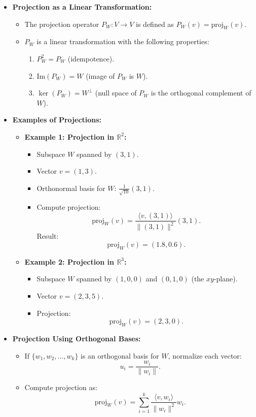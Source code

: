 \documentclass{article}
\begin{document}
\begin{itemize}
  \item \textbf{Projection as a Linear Transformation:}
    \begin{itemize}
      \item The projection operator $P_W: V \to V$ is defined as $P_W(v) = \text{proj}_W(v)$.
      \item $P_W$ is a linear transformation with the following properties:
        \begin{enumerate}
          \item $P_W^2 = P_W$ (idempotence).
          \item $\text{Im}(P_W) = W$ (image of $P_W$ is $W$).
          \item $\ker(P_W) = W^\perp$ (null space of $P_W$ is the orthogonal complement of $W$).
        \end{enumerate}
    \end{itemize}

  \item \textbf{Examples of Projections:}
    \begin{itemize}
      \item \textbf{Example 1: Projection in $\mathbb{R}^2$:}
        \begin{itemize}
          \item Subspace $W$ spanned by $(3, 1)$.
          \item Vector $v = (1, 3)$.
          \item Orthonormal basis for $W$: $\frac{1}{\sqrt{10}}(3, 1)$.
          \item Compute projection:
            \[
              \text{proj}_W(v) = \frac{\langle v, (3, 1) \rangle}{\|(3, 1)\|^2} (3, 1).
            \]
            Result:
            \[
              \text{proj}_W(v) = (1.8, 0.6).
            \]
        \end{itemize}
      \item \textbf{Example 2: Projection in $\mathbb{R}^3$:}
        \begin{itemize}
          \item Subspace $W$ spanned by $(1, 0, 0)$ and $(0, 1, 0)$ (the $xy$-plane).
          \item Vector $v = (2, 3, 5)$.
          \item Projection:
            \[
              \text{proj}_W(v) = (2, 3, 0).
            \]
        \end{itemize}
    \end{itemize}

  \item \textbf{Projection Using Orthogonal Bases:}
    \begin{itemize}
      \item If $\{w_1, w_2, \dots, w_k\}$ is an orthogonal basis for $W$, normalize each vector:
        \[
          u_i = \frac{w_i}{\|w_i\|}.
        \]
      \item Compute projection as:
        \[
          \text{proj}_W(v) = \sum_{i=1}^k \frac{\langle v, w_i \rangle}{\|w_i\|^2} w_i.
        \]
    \end{itemize}
\end{itemize}
\end{document}
